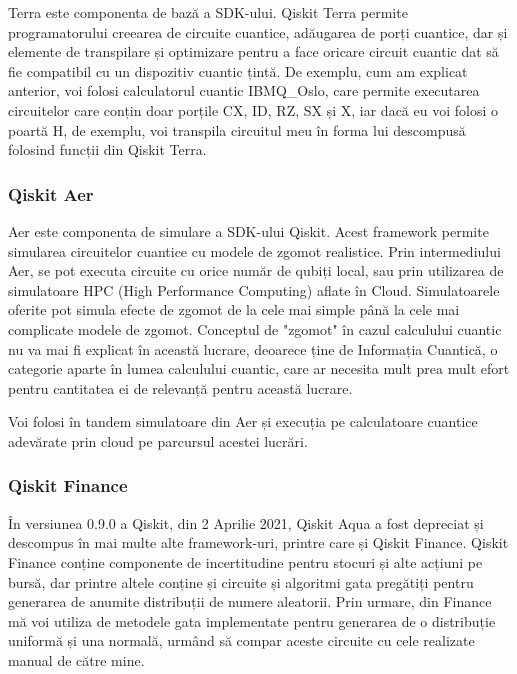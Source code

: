 Terra este componenta de bază a SDK-ului. Qiskit Terra permite programatorului creearea de circuite cuantice, adăugarea de porți cuantice, dar și elemente de transpilare și optimizare pentru a face oricare circuit cuantic dat să fie compatibil cu un dispozitiv cuantic țintă. De exemplu, cum am explicat anterior, voi folosi calculatorul cuantic IBMQ\_Oslo, care permite executarea circuitelor care conțin doar porțile CX, ID, RZ, SX și X, iar dacă eu voi folosi o poartă H, de exemplu, voi transpila circuitul meu în forma lui descompusă folosind funcții din Qiskit Terra.

\subsubsection{Qiskit Aer}

Aer este componenta de simulare a SDK-ului Qiskit. Acest framework permite simularea circuitelor cuantice cu modele de zgomot realistice. Prin intermediului Aer, se pot executa circuite cu orice număr de qubiți local, sau prin utilizarea de simulatoare HPC (High Performance Computing) aflate în Cloud. Simulatoarele oferite pot simula efecte de zgomot de la cele mai simple până la cele mai complicate modele de zgomot. Conceptul de "zgomot" în cazul calculului cuantic nu va mai fi explicat în această lucrare, deoarece ține de Informația Cuantică, o categorie aparte în lumea calculului cuantic, care ar necesita mult prea mult efort pentru cantitatea ei de relevanță pentru această lucrare. 

Voi folosi în tandem simulatoare din Aer și execuția pe calculatoare cuantice adevărate prin cloud pe parcursul acestei lucrări. 

\subsubsection{Qiskit Finance}

În versiunea 0.9.0 a Qiskit, din 2 Aprilie 2021, Qiskit Aqua a fost depreciat și descompus în mai multe alte framework-uri, printre care și Qiskit Finance. Qiskit Finance conține componente de incertitudine pentru stocuri și alte acțiuni pe bursă, dar printre altele conține și circuite și algoritmi gata pregătiți pentru generarea de anumite distribuții de numere aleatorii. Prin urmare, din Finance mă voi utiliza de metodele gata implementate pentru generarea de o distribuție uniformă și una normală, urmând să compar aceste circuite cu cele realizate manual de către mine.

